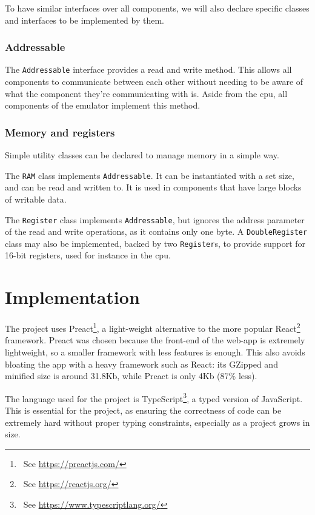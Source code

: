 \documentclass[11pt]{informatics-report}
\newcommand{\ftnt}[1]{\footnote{~See \url{#1}}}
\begin{document}
To have similar interfaces over all components, we will also declare specific classes and interfaces to be implemented by them.

\subsection{Addressable}

The \texttt{Addressable} interface provides a read and write method. This allows all components to communicate between each other without needing to be aware of what the component they're communicating with is. Aside from the \gls{cpu}, all components of the emulator implement this method.

\subsection{Memory and registers}

Simple utility classes can be declared to manage memory in a simple way.

The \texttt{RAM} class implements \texttt{Addressable}. It can be instantiated with a set size, and can be read and written to. It is used in components that have large blocks of writable data.

The \texttt{Register} class implements \texttt{Addressable}, but ignores the address parameter of the read and write operations, as it contains only one byte. A \texttt{DoubleRegister} class may also be implemented, backed by two \texttt{Register}s, to provide support for 16-bit registers, used for instance in the \gls{cpu}.

\chapter{Implementation}

The project uses Preact\ftnt{https://preactjs.com/}, a light-weight alternative to the more popular React\ftnt{https://reactjs.org/} framework. Preact was chosen because the front-end of the web-app is extremely lightweight, so a smaller framework with less features is enough. This also avoids bloating the app with a heavy framework such as React: its GZipped and minified size is around 31.8Kb, while Preact is only 4Kb (87\% less).

The language used for the project is TypeScript\ftnt{https://www.typescriptlang.org/}, a typed version of JavaScript. This is essential for the project, as ensuring the correctness of code can be extremely hard without proper typing constraints, especially as a project grows in size.
\end{document}
